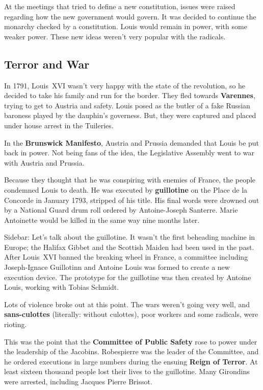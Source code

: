 At the meetings that tried to define a new constitution,
issues were raised regarding how the new government would govern.
It was decided to continue the monarchy checked by a constitution.
Louis would remain in power, with some weaker power.
These new ideas weren't very popular with the radicals.

\subsection*{Terror and War}

In 1791, Louis~XVI wasn't very happy with the state of the revolution,
so he decided to take his family and run for the border.
They fled towards \textbf{Varennes}, trying to get to Austria and safety.
Louis posed as the butler of a fake Russian baroness played by the dauphin's governess.
But, they were captured and placed under house arrest in the Tuileries.

In the \textbf{Brunswick Manifesto}, Austria and Prussia demanded that Louis be put back in power.
Not being fans of the idea, the Legislative Assembly went to war with Austria and Prussia.

Because they thought that he was conspiring with enemies of France, the people condemned Louis to death.
He was executed by \textbf{guillotine} on the Place de la Concorde in January 1793, stripped of his title.
His final words were drowned out by a National Guard drum roll ordered by Antoine-Joseph Santerre.
Marie Antoinette would be killed in the same way nine months later.

Sidebar: Let's talk about the guillotine.
It wasn't the first beheading machine in Europe;
the Halifax Gibbet and the Scottish Maiden had been used in the past.
After Louis~XVI banned the breaking wheel in France,
a committee including Joseph-Ignace Guillotinn and Antoine Louis was formed to create a new execution device.
The prototype for the guillotine was then created by Antoine Louis, working with Tobias Schmidt.

Lots of violence broke out at this point.
The wars weren't going very well, and \textbf{sans-culottes} (literally: without culottes),
poor workers and some radicals, were rioting.

This was the point that the \textbf{Committee of Public Safety} rose to power under the leadership of the Jacobins.
Robespierre was the leader of the Committee,
and he ordered executions in large numbers during the ensuing \textbf{Reign of Terror}.
At least sixteen thousand people lost their lives to the guillotine.
Many Girondins were arrested, including Jacques Pierre Brissot.

